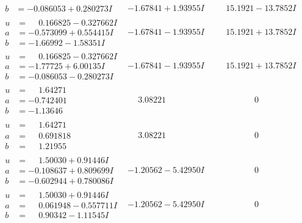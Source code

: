 \documentclass[1p]{elsarticle_modified}
\theoremstyle{definition}
\begin{document}
$$\begin{array}{c|c|c}
\begin{aligned}
b &= -0.086053 + 0.280273 I\end{aligned}
 & -1.67841 + 1.93955 I & \phantom{-}15.1921 - 13.7852 I \\ \hline\begin{aligned}
u &= \phantom{-}0.166825 - 0.327662 I \\
a &= -0.573099 + 0.554415 I \\
b &= -1.66992 - 1.58351 I\end{aligned}
 & -1.67841 - 1.93955 I & \phantom{-}15.1921 + 13.7852 I \\ \hline\begin{aligned}
u &= \phantom{-}0.166825 - 0.327662 I \\
a &= -1.77725 + 6.00135 I \\
b &= -0.086053 - 0.280273 I\end{aligned}
 & -1.67841 - 1.93955 I & \phantom{-}15.1921 + 13.7852 I \\ \hline\begin{aligned}
u &= \phantom{-}1.64271\phantom{ +0.000000I} \\
a &= -0.742401\phantom{ +0.000000I} \\
b &= -1.13646\phantom{ +0.000000I}\end{aligned}
 & \phantom{-}3.08221\phantom{ +0.000000I} & \phantom{-0.000000 } 0 \\ \hline\begin{aligned}
u &= \phantom{-}1.64271\phantom{ +0.000000I} \\
a &= \phantom{-}0.691818\phantom{ +0.000000I} \\
b &= \phantom{-}1.21955\phantom{ +0.000000I}\end{aligned}
 & \phantom{-}3.08221\phantom{ +0.000000I} & \phantom{-0.000000 } 0 \\ \hline\begin{aligned}
u &= \phantom{-}1.50030 + 0.91446 I \\
a &= -0.108637 + 0.809699 I \\
b &= -0.602944 + 0.780086 I\end{aligned}
 & -1.20562 - 5.42950 I & \phantom{-0.000000 } 0 \\ \hline\begin{aligned}
u &= \phantom{-}1.50030 + 0.91446 I \\
a &= \phantom{-}0.061948 - 0.557711 I \\
b &= \phantom{-}0.90342 - 1.11545 I\end{aligned}
 & -1.20562 - 5.42950 I & \phantom{-0.000000 } 0 \\ \hline\begin{aligned}

\end{aligned}
\end{array}$$
\end{document}
